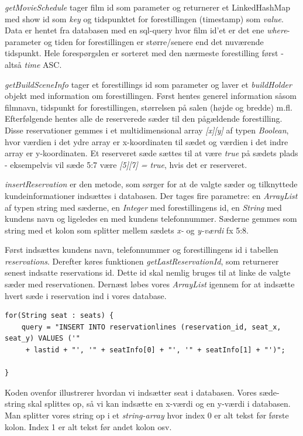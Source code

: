 \documentclass[final]{report}
\begin{document}
\emph{getMovieSchedule} tager film id som parameter og returnerer et LinkedHashMap med show id som \emph{key} og tidspunktet for forestillingen (timestamp) som \emph{value}. Data er hentet fra databasen med en sql-query hvor film id’et er det ene \emph{where}-parameter og tiden for forestillingen er større/senere end det nuværende tidspunkt. Hele forespørgslen er sorteret med den nærmeste forestilling først - altså \emph{time} ASC. 

\emph{getBuildSceneInfo} tager et forestillings id som parameter og laver et \emph{buildHolder} objekt med information om forestillingen. Først hentes generel information såsom filmnavn, tidspunkt for forestillingen, størrelsen på salen (højde og bredde) m.fl. Efterfølgende hentes alle de reserverede sæder til den pågældende forestilling. Disse reservationer gemmes i et multidimensional array \emph{[x][y]} af typen \emph{Boolean}, hvor værdien i det ydre array er x-koordinaten til sædet og værdien i det indre array er y-koordinaten. Et reserveret sæde sættes til at være \emph{true} på sædets plads - eksempelvis vil sæde 5:7 være \emph{[5][7] = true}, hvis det er reserveret. 

\emph{insertReservation} er den metode, som sørger for at de valgte sæder og tilknyttede kundeinformationer indsættes i databasen. Der tages fire parametre: en \emph{ArrayList} af typen string med sæderne, en \emph{Integer} med forestillingens id, en \emph{String} med kundens navn og ligeledes en med kundens telefonnummer. Sæderne gemmes som string med et kolon som splitter mellem sædets \emph{x-} og \emph{y-værdi} fx 5:8.

Først indsættes kundens navn, telefonnummer og forestillingens id i tabellen \emph{reservations}. Derefter køres funktionen \emph{getLastReservationId}, som returnerer senest indsatte reservations id. Dette id skal nemlig bruges til at linke de valgte sæder med reservationen. Dernæst løbes vores \emph{ArrayList} igennem for at indsætte hvert sæde i reservation ind i vores database. \\
\begin{verbatim}
for(String seat : seats) {
    query = "INSERT INTO reservationlines (reservation_id, seat_x, seat_y) VALUES ('"
     + lastid + "', '" + seatInfo[0] + "', '" + seatInfo[1] + "')";
  
}
\end{verbatim}

Koden ovenfor illustrerer hvordan vi indsætter seat i databasen. Vores sæde-string skal splittes op, så vi kan indsætte en x-værdi og en y-værdi i databasen. Man splitter vores string op i et \emph{string-array} hvor index 0 er alt tekst før første kolon. Index 1 er alt tekst før andet kolon osv.
\end{document}
